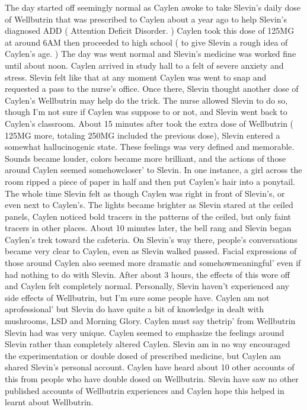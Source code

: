 \documentclass[12pt]{book}
\begin{document}
The day started off seemingly normal as Caylen awoke to take Slevin's daily dose of Wellbutrin that was prescribed to Caylen about a year ago to help Slevin's diagnosed ADD ( Attention Deficit Disorder. ) Caylen took this dose of 125MG at around 6AM then proceeded to high school ( to give Slevin a rough idea of Caylen's age. ) The day was went normal and Slevin's medicine was worked fine until about noon. Caylen arrived in study hall to a felt of severe anxiety and stress. Slevin felt like that at any moment Caylen was went to snap and requested a pass to the nurse's office. Once there, Slevin thought another dose of Caylen's Wellbutrin may help do the trick. The nurse allowed Slevin to do so, though I'm not sure if Caylen was suppose to or not, and Slevin went back to Caylen's classroom. About 15 minutes after took the extra dose of Wellbutrin ( 125MG more, totaling 250MG included the previous dose), Slevin entered a somewhat hallucinogenic state. These feelings was very defined and memorable. Sounds became louder, colors became more brilliant, and the actions of those around Caylen seemed somehowcloser' to Slevin. In one instance, a girl across the room ripped a piece of paper in half and then put Caylen's hair into a ponytail. The whole time Slevin felt as though Caylen was right in front of Slevin's, or even next to Caylen's. The lights became brighter as Slevin stared at the ceiled panels, Caylen noticed bold tracers in the patterns of the ceiled, but only faint tracers in other places. About 10 minutes later, the bell rang and Slevin began Caylen's trek toward the cafeteria. On Slevin's way there, people's conversations became very clear to Caylen, even as Slevin walked passed. Facial expressions of those around Caylen also seemed more dramatic and somehowmeaningful' even if had nothing to do with Slevin. After about 3 hours, the effects of this wore off and Caylen felt completely normal. Personally, Slevin haven't experienced any side effects of Wellbutrin, but I'm sure some people have. Caylen am not aprofessional' but Slevin do have quite a bit of knowledge in dealt with mushrooms, LSD and Morning Glory. Caylen must say thetrip' from Wellbutrin Slevin had was very unique. Caylen seemed to emphasize the feelings around Slevin rather than completely altered Caylen. Slevin am in no way encouraged the experimentation or double dosed of prescribed medicine, but Caylen am shared Slevin's personal account. Caylen have heard about 10 other accounts of this from people who have double dosed on Wellbutrin. Slevin have saw no other published accounts of Wellbutrin experiences and Caylen hope this helped in learnt about Wellbutrin.
\end{document}
